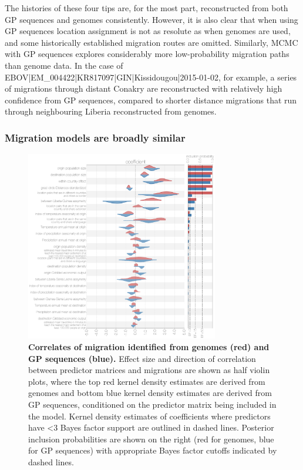 \documentclass[11pt,oneside,letterpaper]{article}
\begin{document}
The histories of these four tips are, for the most part, reconstructed from both GP sequences and genomes consistently.
However, it is also clear that when using GP sequences location assignment is not as resolute as when genomes are used, and some historically established migration routes are omitted.
Similarly, MCMC with GP sequences explores considerably more low-probability migration paths than genome data.
In the case of EBOV|EM\_004422|KR817097|GIN|Kissidougou|2015-01-02, for example, a series of migrations through distant Conakry are reconstructed with relatively high confidence from GP sequences, compared to shorter distance migrations that run through neighbouring Liberia reconstructed from genomes.

\subsubsection*{Migration models are broadly similar}

\begin{figure}[ht]
 \centering
	\includegraphics[width=0.75\textwidth]{figures/fig4_glm.png}
	\caption{\textbf{Correlates of migration identified from genomes (red) and GP sequences (blue).}
  Effect size and direction of correlation between predictor matrices and migrations are shown as half violin plots, where the top red kernel density estimates are derived from genomes and bottom blue kernel density estimates are derived from GP sequences, conditioned on the predictor matrix being included in the model.
  Kernel density estimates of coefficients where predictors have <3 Bayes factor support are outlined in dashed lines.
  Posterior inclusion probabilities are shown on the right (red for genomes, blue for GP sequences) with appropriate Bayes factor cutoffs indicated by dashed lines.
	}
	\label{glm}
\end{figure}
\end{document}
